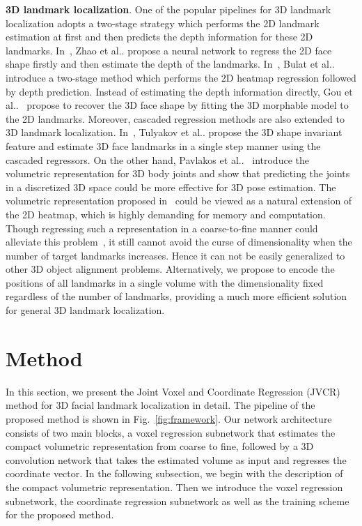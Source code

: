 \documentclass[a4paper,conference]{IEEEtran}
\makeatletter
\DeclareRobustCommand\onedot{\futurelet\@let@token\@onedot}
\def\@onedot{\ifx\@let@token.\else.\null\fi\xspace}
\def\etal{{et al}\onedot}
\makeatother
\begin{document}
{\bf 3D landmark localization}.
One of the popular pipelines for 3D landmark localization adopts a two-stage strategy which performs the 2D landmark estimation at first and then predicts the depth information for these 2D landmarks.
In~\cite{zhao2016fast}, Zhao \etal propose a neural network to regress the 2D face shape firstly and then estimate the depth of the landmarks.
In~\cite{bulat2016two}, Bulat \etal introduce a two-stage method which performs the 2D heatmap regression followed by depth prediction.
Instead of estimating the depth information directly, Gou \etal~\cite{gou2016shape} propose to recover the 3D face shape by fitting the 3D morphable model to the 2D landmarks.
Moreover, cascaded regression methods are also extended to 3D landmark localization.
In~\cite{Tulyakov2017Viewpoint}, Tulyakov \etal propose the 3D shape invariant feature and estimate 3D face landmarks in a single step manner using the cascaded regressors.
On the other hand, Pavlakos \etal~\cite{pavlakos2017coarse} introduce the volumetric representation for 3D body joints and show that predicting the joints in a discretized 3D space could be more effective for 3D pose estimation.
The volumetric representation proposed in~\cite{pavlakos2017coarse} could be viewed as a natural extension of the 2D heatmap, which is highly demanding for memory and computation.
Though regressing such a representation in a coarse-to-fine manner could alleviate this problem~\cite{pavlakos2017coarse}, it still cannot avoid the curse of dimensionality when the number of target landmarks increases.
Hence it can not be easily generalized to other 3D object alignment problems.
Alternatively, we propose to encode the positions of all landmarks in a single volume with the dimensionality fixed regardless of the number of landmarks, providing a much more efficient solution for general 3D landmark localization.



\section{Method}
\label{Method}

In this section, we present the Joint Voxel and Coordinate Regression (JVCR) method for 3D facial landmark localization in detail.
The pipeline of the proposed method is shown in Fig.~\ref{fig:framework}.
Our network architecture consists of two main blocks, a voxel regression subnetwork that estimates the compact volumetric representation from coarse to fine, followed by a 3D convolution network that takes the estimated volume as input and regresses the coordinate vector.
In the following subsection, we begin with the description of the compact volumetric representation.
Then we introduce the voxel regression subnetwork, the coordinate regression subnetwork as well as the training scheme for the proposed method.
\end{document}
